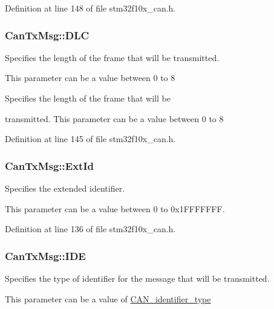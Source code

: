 Definition at line 148 of file stm32f10x\-\_\-can.\-h.

\hypertarget{struct_can_tx_msg_ab49d0fa602aad2fd9cd007adafc11fc2}{
\subsubsection[{D\-L\-C}]{ Can\-Tx\-Msg\-::\-D\-L\-C}}\label{struct_can_tx_msg_ab49d0fa602aad2fd9cd007adafc11fc2}
\begin{DoxyVerb}     Specifies the length of the frame that will be transmitted.
\end{DoxyVerb}
 This parameter can be a value between 0 to 8

\begin{DoxyVerb}     Specifies the length of the frame that will be 
\end{DoxyVerb}
 transmitted. This parameter can be a value between 0 to 8 

Definition at line 145 of file stm32f10x\-\_\-can.\-h.

\hypertarget{struct_can_tx_msg_a33050a95a4cc463b589ff16bdd416f22}{
\subsubsection[{Ext\-Id}]{ Can\-Tx\-Msg\-::\-Ext\-Id}}\label{struct_can_tx_msg_a33050a95a4cc463b589ff16bdd416f22}
\begin{DoxyVerb}  Specifies the extended identifier.
\end{DoxyVerb}
 This parameter can be a value between 0 to 0x1\-F\-F\-F\-F\-F\-F\-F. 

Definition at line 136 of file stm32f10x\-\_\-can.\-h.

\hypertarget{struct_can_tx_msg_aa4c8568a0e3250a17bd7e116b3e09670}{
\subsubsection[{I\-D\-E}]{ Can\-Tx\-Msg\-::\-I\-D\-E}}\label{struct_can_tx_msg_aa4c8568a0e3250a17bd7e116b3e09670}
\begin{DoxyVerb}     Specifies the type of identifier for the message that will be transmitted.
\end{DoxyVerb}
 This parameter can be a value of \hyperlink{group___c_a_n__identifier__type}{C\-A\-N\-\_\-identifier\-\_\-type}

